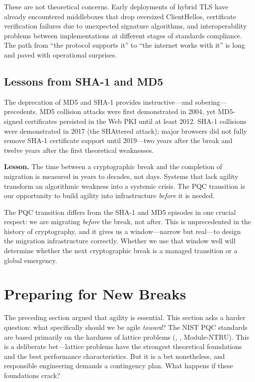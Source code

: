These are not theoretical concerns.  Early deployments of hybrid TLS have already encountered middleboxes that drop oversized ClientHellos, certificate verification failures due to unexpected signature algorithms, and interoperability problems between implementations at different stages of standards compliance.  The path from ``the protocol supports it'' to ``the internet works with it'' is long and paved with operational surprises.

\subsection{Lessons from SHA-1 and MD5}
\label{subsec:sha1-lessons}

The deprecation of MD5 and SHA-1 provides instructive---and sobering---precedents.  MD5 collision attacks were first demonstrated in 2004, yet MD5-signed certificates persisted in the Web PKI until at least 2012.  SHA-1 collisions were demonstrated in 2017 (the SHAttered attack); major browsers did not fully remove SHA-1 certificate support until 2019---two years after the break and twelve years after the first theoretical weaknesses.

\begin{svgraybox}
\textbf{Lesson.}
The time between a cryptographic break and the completion of migration is measured in years to decades, not days.  Systems that lack agility transform an algorithmic weakness into a systemic crisis.  The PQC transition is our opportunity to build agility into infrastructure \emph{before} it is needed.
\end{svgraybox}

The PQC transition differs from the SHA-1 and MD5 episodes in one crucial respect: we are migrating \emph{before} the break, not after.  This is unprecedented in the history of cryptography, and it gives us a window---narrow but real---to design the migration infrastructure correctly.  Whether we use that window well will determine whether the next cryptographic break is a managed transition or a global emergency.


\section{Preparing for New Breaks}
\label{sec:preparing-breaks}

The preceding section argued that agility is essential.  This section asks a harder question: what specifically should we be agile \emph{toward}?  The NIST PQC standards are based primarily on the hardness of lattice problems (\mlwe{}, \rlwe{}, Module-NTRU).  This is a deliberate bet---lattice problems have the strongest theoretical foundations and the best performance characteristics.  But it is a bet nonetheless, and responsible engineering demands a contingency plan.  What happens if these foundations crack?

